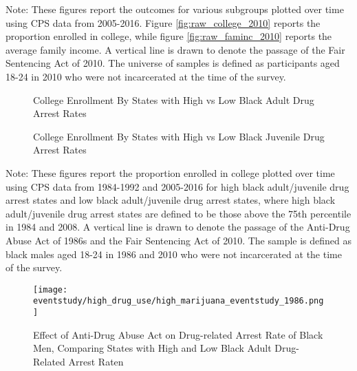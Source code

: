   \begin{footnotesize}
    \noindent Note: These figures report the outcomes for various subgroups plotted over time using CPS data from 2005-2016. Figure \ref{fig:raw_college_2010} reports the proportion enrolled in college, while figure \ref{fig:raw_faminc_2010} reports the average family income. A vertical line is drawn to denote the passage of the Fair Sentencing Act of 2010. The universe of samples is defined as participants aged 18-24 in 2010 who were not incarcerated at the time of the survey.
  \end{footnotesize}
  
  \clearpage
  
  \begin{figure}[h]
    \centering
    \caption{College Enrollment By States with High vs Low Black Adult Drug Arrest Rates}%
    \qquad
    \label{fig:raw_college_highlowab_1986}%
  \end{figure}
  \begin{figure}[h]
    \centering
    \caption{College Enrollment By States with High vs Low Black Juvenile Drug Arrest Rates}%
    \qquad
    \label{fig:raw_college_highlowjb_1986}%
  \end{figure}
  \begin{footnotesize}
    \noindent Note: These figures report the proportion enrolled in college plotted over time using CPS data from 1984-1992 and 2005-2016 for high black adult/juvenile drug arrest states and low black adult/juvenile drug arrest states, where high black adult/juvenile drug arrest states are defined to be those above the 75th percentile in 1984 and 2008. A vertical line is drawn to denote the passage of the Anti-Drug Abuse Act of 1986s and the Fair Sentencing Act of 2010. The sample is defined as black males aged 18-24 in 1986 and 2010 who were not incarcerated at the time of the survey.
  \end{footnotesize}
  
  \clearpage
  
  \begin{figure}[h]
    \caption{Effect of Anti-Drug Abuse Act on Drug-related Arrest Rate of Black Men, Comparing States with High and Low Black Adult Drug-Related Arrest Raten}
    \centering
    \texttt{[image: eventstudy/high\_drug\_use/high\_marijuana\_eventstudy\_1986.png]}
    \label{fig:ab_es_1986}
  \end{figure}
  

